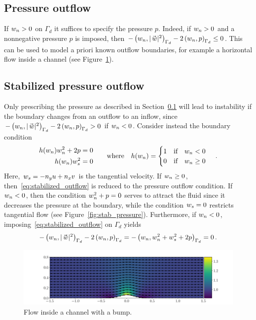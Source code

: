 \subsection{Pressure outflow}\label{sec:pressure_outflow}
If $w_n > 0$  on $\Gamma_d$ it suffices to specify the pressure $p$. Indeed, if $w_n > 0$ and a nonnegative pressure $p$ is imposed, then $-\ipbcpart{\wcn}{|\wc|^2} - 2\ipbcpart{\wcn}{p} \leq 0$. This can be used to model a priori known outflow boundaries, for example a horizontal flow inside a channel (see Figure~\ref{fig:bump_flow}).

\subsection{Stabilized pressure outflow}%
\label{sub:stab_pressure}
Only prescribing the pressure as described in Section~\ref{sec:pressure_outflow} will lead to instability if the boundary changes from an outflow to an inflow, since $-\ipgd{\wcn}{|\wc|^2} - 2\ipgd{\wcn}{p} > 0$ if $w_n < 0$. Consider instead the boundary condition
\begin{equation}
  \begin{aligned}
    h(w_n) w_n^2 + 2p & = 0
    \\
    h(w_n) w_s^2 & = 0
  \end{aligned}
  \quad \quad \text{where} \quad
  h(w_n) =
  \begin{cases}
     1 \quad \text{if} \quad w_n < 0
     \\
     0 \quad \text{if} \quad w_n \ge 0
  \end{cases}
  \,.
  \label{eq:stabilized_outflow}
\end{equation}
Here, $w_s = -n_y u + n_x v$ is the tangential velocity. If $w_n \geq 0$, then~\eqref{eq:stabilized_outflow} is reduced to the pressure outflow condition. If $w_n < 0$, then the condition $w_n^2 + p = 0$ serves to attract the fluid since it decreases the pressure at the boundary, while the condition $w_s = 0$ restricts tangential flow (see Figure~\ref{fig:stab_pressure}). Furthermore, if $w_n < 0$, imposing~\eqref{eq:stabilized_outflow} on $\Gamma_d$ yields
\begin{equation*}
  -\ipbcpart{\wcn}{|\wc|^2} - 2\ipbcpart{\wcn}{p} = -\ipbcpart{\wcn}{\wcn^2 + \wct^2 + 2p} = 0 \,.
\end{equation*}

\begin{figure}%
  \centering
  \includegraphics[width=\textwidth]{images/bump_flow.pdf}
  \caption{Flow inside a channel with a bump.}%
  \label{fig:bump_flow}
\end{figure}


